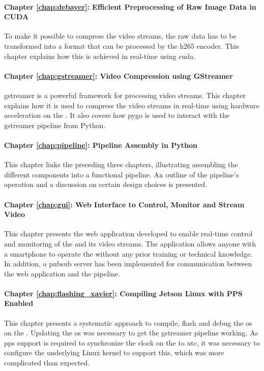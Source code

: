 \paragraph{Chapter \ref{chap:debayer}: Efficient Preprocessing of Raw Image Data in CUDA}
To make it possible to compress the video streams, the raw data has to be transformed into a format that can be processed by the \gls{h265} encoder.
This chapter explains how this is achieved in real-time using \gls{cuda}.

\paragraph{Chapter \ref{chap:gstreamer}: Video Compression using GStreamer}
\gls{gstreamer} is a powerful framework for processing video streams.
This chapter explains how it is used to compress the video streams in real-time using hardware acceleration on the \jx.
It also covers how \gls{pygo} is used to interact with the \gls{gstreamer} pipeline from Python.

\paragraph{Chapter \ref{chap:pipeline}: Pipeline Assembly in Python}
This chapter links the preceding three chapters, illustrating assembling the different components into a functional pipeline.
An outline of the pipeline's operation and a discussion on certain design choices is presented.

\paragraph{Chapter \ref{chap:gui}: Web Interface to Control, Monitor and Stream Video}
This chapter presents the web application developed to enable real-time control and monitoring of the \sr and its video streams.
The application allows anyone with a smartphone to operate the \sr without any prior training or technical knowledge.
In addition, a \gls{pubsub} server has been implemented for communication between the web application and the pipeline.

\paragraph{Chapter \ref{chap:flashing_xavier}: Compiling Jetson Linux with PPS Enabled}
This chapter presents a systematic approach to compile, flash and debug the \gls{os} on the \jx.
Updating the \gls{os} was necessary to get the \gls{gstreamer} pipeline working.
As \gls{pps} support is required to synchronize the clock on the \jx to \gls{utc}, it was necessary to configure the underlying Linux kernel to support this, which was more complicated than expected.

